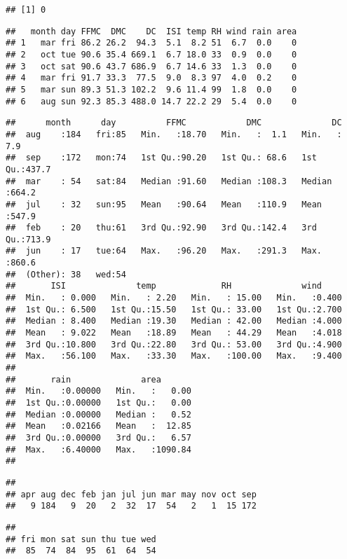 \documentclass[
]{article}
\begin{document}
\begin{verbatim}
## [1] 0
\end{verbatim}

\begin{verbatim}
##   month day FFMC  DMC    DC  ISI temp RH wind rain area
## 1   mar fri 86.2 26.2  94.3  5.1  8.2 51  6.7  0.0    0
## 2   oct tue 90.6 35.4 669.1  6.7 18.0 33  0.9  0.0    0
## 3   oct sat 90.6 43.7 686.9  6.7 14.6 33  1.3  0.0    0
## 4   mar fri 91.7 33.3  77.5  9.0  8.3 97  4.0  0.2    0
## 5   mar sun 89.3 51.3 102.2  9.6 11.4 99  1.8  0.0    0
## 6   aug sun 92.3 85.3 488.0 14.7 22.2 29  5.4  0.0    0
\end{verbatim}

\begin{verbatim}
##      month      day          FFMC            DMC              DC       
##  aug    :184   fri:85   Min.   :18.70   Min.   :  1.1   Min.   :  7.9  
##  sep    :172   mon:74   1st Qu.:90.20   1st Qu.: 68.6   1st Qu.:437.7  
##  mar    : 54   sat:84   Median :91.60   Median :108.3   Median :664.2  
##  jul    : 32   sun:95   Mean   :90.64   Mean   :110.9   Mean   :547.9  
##  feb    : 20   thu:61   3rd Qu.:92.90   3rd Qu.:142.4   3rd Qu.:713.9  
##  jun    : 17   tue:64   Max.   :96.20   Max.   :291.3   Max.   :860.6  
##  (Other): 38   wed:54                                                  
##       ISI              temp             RH              wind      
##  Min.   : 0.000   Min.   : 2.20   Min.   : 15.00   Min.   :0.400  
##  1st Qu.: 6.500   1st Qu.:15.50   1st Qu.: 33.00   1st Qu.:2.700  
##  Median : 8.400   Median :19.30   Median : 42.00   Median :4.000  
##  Mean   : 9.022   Mean   :18.89   Mean   : 44.29   Mean   :4.018  
##  3rd Qu.:10.800   3rd Qu.:22.80   3rd Qu.: 53.00   3rd Qu.:4.900  
##  Max.   :56.100   Max.   :33.30   Max.   :100.00   Max.   :9.400  
##                                                                   
##       rain              area        
##  Min.   :0.00000   Min.   :   0.00  
##  1st Qu.:0.00000   1st Qu.:   0.00  
##  Median :0.00000   Median :   0.52  
##  Mean   :0.02166   Mean   :  12.85  
##  3rd Qu.:0.00000   3rd Qu.:   6.57  
##  Max.   :6.40000   Max.   :1090.84  
## 
\end{verbatim}

\begin{verbatim}
## 
## apr aug dec feb jan jul jun mar may nov oct sep 
##   9 184   9  20   2  32  17  54   2   1  15 172
\end{verbatim}

\begin{verbatim}
## 
## fri mon sat sun thu tue wed 
##  85  74  84  95  61  64  54
\end{verbatim}
\end{document}
